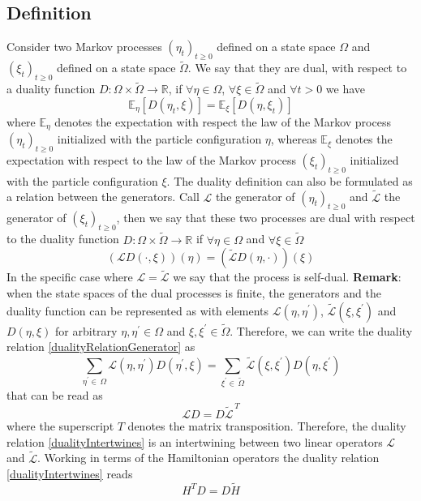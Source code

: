 \documentclass[11pt]{article}
\numberwithin{equation}{section}
\numberwithin{equation}{subsection}
\begin{document}
\subsection{Definition}
Consider two Markov processes $(\eta_{t})_{t\geq 0}$ defined on a state space $\Omega$ and $(\xi_{t})_{t\geq 0}$ defined on a state space $\widetilde{\Omega}$. We say that they are dual, with respect to a duality function $D:\Omega\times \widetilde{\Omega}\to \mathbb{R}$, if $\forall \eta\in\Omega$, $\forall \xi\in\widetilde{\Omega}$ and $\forall t> 0$ we have 
\begin{equation}
    \mathbb{E}_{\eta}\left[D(\eta_{t},\xi)\right]=\mathbb{E}_{\xi}\left[D(\eta,\xi_{t})\right]
\end{equation}
where $\mathbb{E}_{\eta}$ denotes the expectation with respect the law of the Markov process $(\eta_{t})_{t\geq 0}$ initialized with the particle configuration $\eta$, whereas $\mathbb{E}_{\xi}$ denotes the expectation with respect to the law of the Markov process $(\xi_{t})_{t\geq 0}$ initialized with the particle configuration $\xi$.
The duality definition can also be formulated as a relation between the generators. Call $\mathcal{L}$ the generator of $(\eta_{t})_{t\geq0}$ and $\widetilde{\mathcal{L}}$ the generator of $(\xi_{t})_{t\geq 0}$, then we say that these two processes are dual with respect to the duality function $D:\Omega\times \widetilde{\Omega}\to \mathbb{R}$ if $\forall \eta\in\Omega$ and $\forall \xi\in\widetilde{\Omega}$
\begin{equation}\label{dualityRelationGenerator}
    \left(\mathcal{L}D(\cdot,\xi)\right)(\eta)=\left(\widetilde{\mathcal{L}}D(\eta,\cdot)\right)(\xi)
\end{equation}
In the specific case where $\mathcal{L}=\widetilde{\mathcal{L}}$ we say that the process is self-dual.
\newline
\newline
\textbf{Remark}:
when the state spaces of the dual processes is finite, the generators and the duality function can be represented as with elements $\mathcal{L}(\eta,\eta^{'})$, $\widetilde{\mathcal{L}}(\xi,\xi^{'})$ and $D(\eta,\xi)$ for arbitrary $\eta,\eta^{'}\in\Omega$ and $\xi,\xi^{'}\in \widetilde{\Omega}$. Therefore, we can write the duality relation \eqref{dualityRelationGenerator} as 
\begin{equation}
    \sum_{\eta^{'}\in\,\Omega}\mathcal{L}(\eta,\eta^{'})D(\eta^{'},\xi)=\sum_{\xi^{'}\in\, \widetilde{\Omega}}\widetilde{\mathcal{L}}(\xi,\xi^{'})D(\eta,\xi^{'})
\end{equation}
that can be read as
\begin{equation}\label{dualityIntertwines}
    \mathcal{L}D=D\widetilde{\mathcal{L}}^{\,T}
\end{equation}
where the superscript $T$ denotes the matrix transposition. Therefore, the duality relation \eqref{dualityIntertwines} is an intertwining between two linear operators $\mathcal{L}$ and $\widetilde{\mathcal{L}}$. Working in terms of the Hamiltonian operators the duality relation \eqref{dualityIntertwines} reads 
\begin{equation}\label{DualityRelation}
    H^{T}D=D\widetilde{H}
\end{equation}
\end{document}
